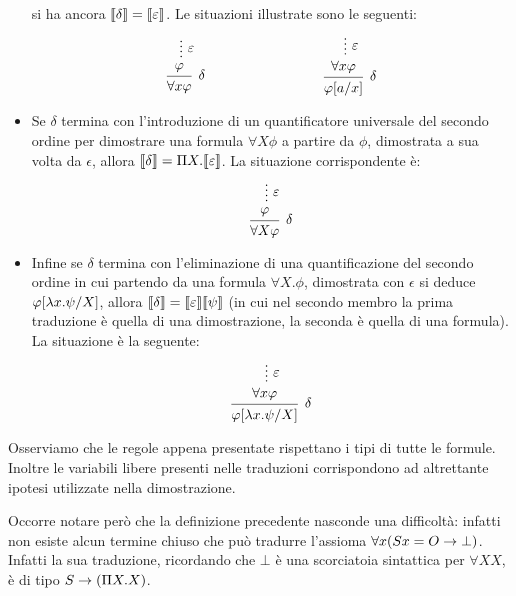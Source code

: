 \documentclass[]{marticle}
\begin{document}
\begin{itemize}
        si ha ancora $\llbracket \delta \rrbracket=\llbracket \varepsilon \rrbracket$.
        Le situazioni illustrate sono le seguenti:
        \[
            \begin{prooftree}
                \hypo{}
                \ellipsis{$\epsilon$}{\phi}
                \infer1[$\delta$]{\forall x \phi}
            \end{prooftree}
            \hspace{3cm}
            \begin{prooftree}
                \hypo{}
                \ellipsis{$\epsilon$}{\forall x \phi}
                \infer1[$\delta$]{\phi\sub{a}{x}}
            \end{prooftree}
        \]
    \item Se $\delta$ termina con l'introduzione di un quantificatore universale
        del secondo ordine per dimostrare una formula $\forall X\phi$ a partire
        da  $\phi$, dimostrata a sua volta da $\epsilon$, allora $\llbracket \delta \rrbracket =
        \Pi X. \llbracket \varepsilon \rrbracket$. La situazione corrispondente \`e:
        \[
            \begin{prooftree}
                \hypo{}
                \ellipsis{$\epsilon$}{\phi}
                \infer1[$\delta$]{\forall X \phi}
            \end{prooftree}
        \]
    \item Infine se $\delta$ termina con l'eliminazione di una quantificazione
        del secondo ordine in cui partendo da una formula $\forall X.\phi$,
        dimostrata con $\epsilon$ si deduce $\varphi[\lambda x. \psi/X]$, allora
        $\llbracket \delta \rrbracket = \llbracket \varepsilon \rrbracket\llbracket \psi \rrbracket$ (in cui nel secondo membro la
        prima traduzione \`e quella di una dimostrazione, la seconda \`e quella
        di una formula). La situazione \`e la seguente:
        \[
            \begin{prooftree}
                \hypo{}
                \ellipsis{$\epsilon$}{\forall x \phi}
                \infer1[$\delta$]{\phi\sub{\l x.\psi}{X}}
            \end{prooftree}
        \]
\end{itemize}

Osserviamo che le regole appena presentate rispettano i tipi di tutte le
formule. Inoltre le variabili libere presenti nelle traduzioni corrispondono ad
altrettante ipotesi utilizzate nella dimostrazione.

Occorre notare per\`o che la definizione precedente nasconde una difficolt\`a:
infatti non esiste alcun termine chiuso che pu\`o tradurre l'assioma $\forall x
(Sx=O \rightarrow \bot)$. Infatti la sua traduzione, ricordando che $\bot$ \`e una
scorciatoia sintattica per $\forall XX$, \`e di tipo $S\rightarrow (\Pi X.X)$. 
\end{document}
